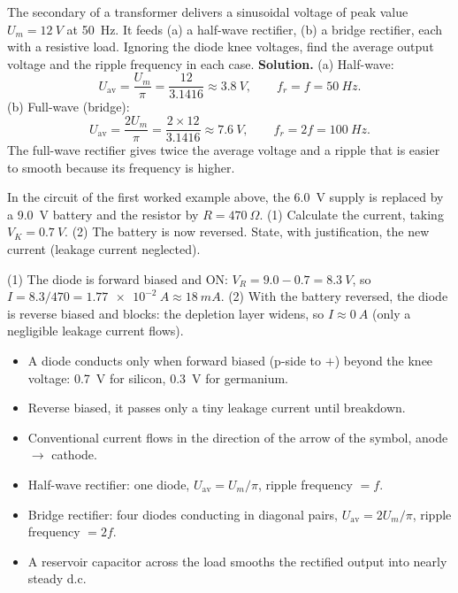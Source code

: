 \documentclass[11pt]{article}
\begin{document}
\begin{exoresolu}
The secondary of a transformer delivers a sinusoidal voltage of peak value $U_m = \SI{12}{V}$ at \SI{50}{Hz}. It feeds (a) a half-wave rectifier, (b) a bridge rectifier, each with a resistive load. Ignoring the diode knee voltages, find the average output voltage and the ripple frequency in each case.
\tcblower
\textbf{Solution.}
(a) Half-wave:
\[
U_{\text{av}} = \frac{U_m}{\pi} = \frac{12}{3.1416} \approx \SI{3.8}{V}, \qquad f_r = f = \SI{50}{Hz}.
\]
(b) Full-wave (bridge):
\[
U_{\text{av}} = \frac{2U_m}{\pi} = \frac{2 \times 12}{3.1416} \approx \SI{7.6}{V}, \qquad f_r = 2f = \SI{100}{Hz}.
\]
The full-wave rectifier gives twice the average voltage and a ripple that is easier to smooth because its frequency is higher.
\end{exoresolu}

\begin{exercice}
In the circuit of the first worked example above, the \SI{6.0}{V} supply is replaced by a \SI{9.0}{V} battery and the resistor by $R = \SI{470}{\Omega}$. (1) Calculate the current, taking $V_K = \SI{0.7}{V}$. (2) The battery is now reversed. State, with justification, the new current (leakage current neglected).
\end{exercice}

\begin{corrige}[Exercise 1]
(1) The diode is forward biased and ON: $V_R = 9.0 - 0.7 = \SI{8.3}{V}$, so $I = 8.3/470 = \SI{1.77e-2}{A} \approx \SI{18}{mA}$.
(2) With the battery reversed, the diode is reverse biased and blocks: the depletion layer widens, so $I \approx \SI{0}{A}$ (only a negligible leakage current flows).
\end{corrige}

\begin{aretenir}
\begin{itemize}
\item A diode conducts only when forward biased (p-side to $+$) beyond the knee voltage: \SI{0.7}{V} for silicon, \SI{0.3}{V} for germanium.
\item Reverse biased, it passes only a tiny leakage current until breakdown.
\item Conventional current flows in the direction of the arrow of the symbol, anode $\to$ cathode.
\item Half-wave rectifier: one diode, $U_{\text{av}} = U_m/\pi$, ripple frequency $= f$.
\item Bridge rectifier: four diodes conducting in diagonal pairs, $U_{\text{av}} = 2U_m/\pi$, ripple frequency $= 2f$.
\item A reservoir capacitor across the load smooths the rectified output into nearly steady d.c.
\end{itemize}
\end{aretenir}
\end{document}
